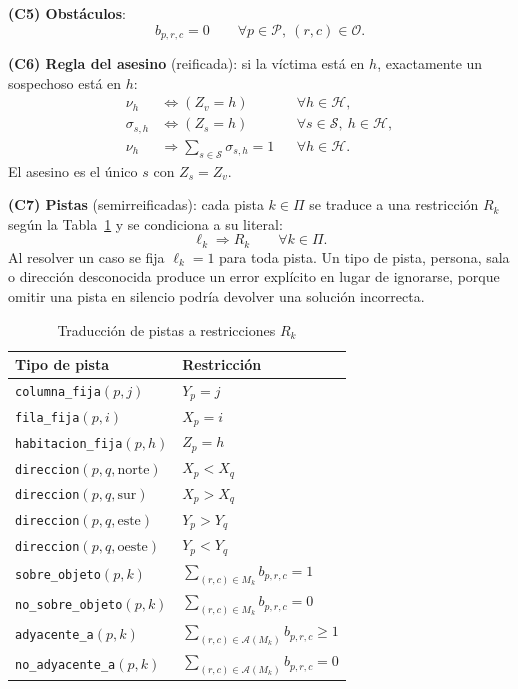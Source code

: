 \documentclass[conference,a4paper]{IEEEtran}
\begin{document}
\textbf{(C5) Obstáculos}:
\begin{equation}
  b_{p,r,c} = 0 \qquad \forall p\in\mathcal{P},\ (r,c)\in\mathcal{O}.
\end{equation}

\textbf{(C6) Regla del asesino} (reificada): si la víctima está en $h$, exactamente un
sospechoso está en $h$:
\begin{align}
  \nu_h &\Leftrightarrow (Z_v = h) && \forall h\in\mathcal{H},\\
  \sigma_{s,h} &\Leftrightarrow (Z_s = h) && \forall s\in\mathcal{S},\ h\in\mathcal{H},\\
  \nu_h &\Rightarrow \textstyle\sum_{s\in\mathcal{S}} \sigma_{s,h} = 1 && \forall h\in\mathcal{H}.
\end{align}
El asesino es el único $s$ con $Z_s=Z_v$.

\textbf{(C7) Pistas} (semirreificadas): cada pista $k\in\Pi$ se traduce a una restricción
$R_k$ según la Tabla~\ref{tab:pistas} y se condiciona a su literal:
\begin{equation}
  \ell_k \Rightarrow R_k \qquad \forall k\in\Pi.
\end{equation}
Al resolver un caso se fija $\ell_k=1$ para toda pista. Un tipo de pista, persona, sala o
dirección desconocida produce un error explícito en lugar de ignorarse, porque omitir una
pista en silencio podría devolver una solución incorrecta.

\begin{table}[t]
\centering
\caption{Traducción de pistas a restricciones $R_k$}
\label{tab:pistas}
\begin{tabular}{ll}
\toprule
\textbf{Tipo de pista} & \textbf{Restricción}\\
\midrule
\texttt{columna\_fija}$(p,j)$ & $Y_p = j$\\
\texttt{fila\_fija}$(p,i)$ & $X_p = i$\\
\texttt{habitacion\_fija}$(p,h)$ & $Z_p = h$\\
\texttt{direccion}$(p,q,\text{norte})$ & $X_p < X_q$\\
\texttt{direccion}$(p,q,\text{sur})$ & $X_p > X_q$\\
\texttt{direccion}$(p,q,\text{este})$ & $Y_p > Y_q$\\
\texttt{direccion}$(p,q,\text{oeste})$ & $Y_p < Y_q$\\
\texttt{sobre\_objeto}$(p,k)$ & $\sum_{(r,c)\in M_k} b_{p,r,c} = 1$\\
\texttt{no\_sobre\_objeto}$(p,k)$ & $\sum_{(r,c)\in M_k} b_{p,r,c} = 0$\\
\texttt{adyacente\_a}$(p,k)$ & $\sum_{(r,c)\in\mathcal{A}(M_k)} b_{p,r,c} \ge 1$\\
\texttt{no\_adyacente\_a}$(p,k)$ & $\sum_{(r,c)\in\mathcal{A}(M_k)} b_{p,r,c} = 0$\\
\bottomrule
\end{tabular}
\end{table}
\end{document}
